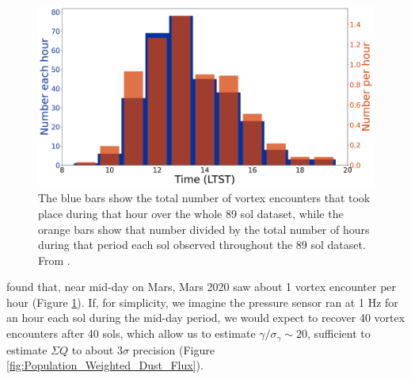 \begin{figure}
    \centering
    \includegraphics[width=\textwidth]{figures/vortex_occurrence_each_hour.png}
    \caption{The blue bars show the total number of vortex encounters that took place during that hour over the whole 89 sol dataset, while the orange bars show that number divided by the total number of hours during that period each sol observed throughout the 89 sol dataset. From \citet{2022PSJ.....3...20J}.}
    \label{fig:vortex_occurrence_each_hour}
\end{figure}

\citet{Jackson2022} found that, near mid-day on Mars, Mars 2020 saw about 1 vortex encounter per hour (Figure \ref{fig:vortex_occurrence_each_hour}). If, for simplicity, we imagine the pressure sensor ran at 1 Hz for an hour each sol during the mid-day period, we would expect to recover 40 vortex encounters after 40 sols, which allow us to estimate $\gamma/\sigma_\gamma \sim 20$, sufficient to estimate $\Sigma Q$ to about 3$\sigma$ precision (Figure \ref{fig:Population_Weighted_Dust_Flux}).